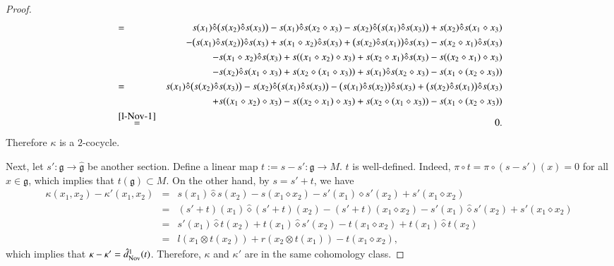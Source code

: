 \documentclass[12pt]{amsart}
\theoremstyle{definition}
\newcommand{\g}{\mathfrak g}
\newcommand{\ot}{\otimes}
\newcommand{\nov}{{\rm Nov}}
\begin{document}
\begin{proof}
\begin{eqnarray*}
		&=& s(x_1)\hat{\diamond}\bigl(s(x_2)\hat{\diamond}s(x_3)\bigr)
		- s(x_1)\hat{\diamond}s(x_2\diamond x_3) - s(x_2)\hat{\diamond}\bigl(s(x_1)\hat{\diamond}s(x_3)\bigr)+ s(x_2)\hat{\diamond}s(x_1\diamond x_3) \\
		&&- \bigl(s(x_1)\hat{\diamond}s(x_2)\bigr)\hat{\diamond}s(x_3)
		+ s(x_1\diamond x_2)\hat{\diamond}s(x_3)+ \bigl(s(x_2)\hat{\diamond}s(x_1)\bigr)\hat{\diamond}s(x_3)- s(x_2\diamond x_1)\hat{\diamond}s(x_3) \\
		&&- s(x_1\diamond x_2)\hat{\diamond}s(x_3)
		+ s((x_1\diamond x_2)\diamond x_3) + s(x_2\diamond x_1)\hat{\diamond}s(x_3)- s((x_2\diamond x_1)\diamond x_3) \\
		&&- s(x_2)\hat{\diamond}s(x_1\diamond x_3)
		+ s(x_2\diamond(x_1\diamond x_3)) + s(x_1)\hat{\diamond}s(x_2\diamond x_3)- s(x_1\diamond(x_2\diamond x_3))\\
		&=& s(x_1)\hat{\diamond}\bigl(s(x_2)\hat{\diamond}s(x_3)\bigr)
		- s(x_2)\hat{\diamond}\bigl(s(x_1)\hat{\diamond}s(x_3)\bigr) - \bigl(s(x_1)\hat{\diamond}s(x_2)\bigr)\hat{\diamond}s(x_3)
		+ \bigl(s(x_2)\hat{\diamond}s(x_1)\bigr)\hat{\diamond}s(x_3)\\
		&& + s((x_1\diamond x_2)\diamond x_3)
		- s((x_2\diamond x_1)\diamond x_3) + s(x_2\diamond(x_1\diamond x_3))
		- s(x_1\diamond(x_2\diamond x_3))\\
		&\overset{\eqref{l-Nov-1}}{=}&0.
	\end{eqnarray*}
	Therefore $\kappa$ is a $2$-cocycle.
	
	Next, let $s':\g\to\hat{\g}$ be another section. Define a linear map $t:=s-s':\g\to M$. $t$ is well-defined. Indeed, $\pi\circ t=\pi\circ(s-s')(x)=0$ for all $x\in\g$, which implies that $t(\g)\subset M$.
		On the other hand, by $s=s'+t$, we have
	\begin{eqnarray*}
		\kappa(x_1,x_2)-\kappa'(x_1,x_2)&=&s(x_1)\hat{\diamond} s(x_2)-s(x_1\diamond x_2)-s'(x_1)\hat{\diamond} s'(x_2)+s'(x_1\diamond x_2)\\
		&=&(s'+t)(x_1)\hat{\diamond} (s'+t)(x_2)-(s'+t)(x_1\diamond x_2)-s'(x_1)\hat{\diamond} s'(x_2)+s'(x_1\diamond x_2)\\
		&=&s'(x_1)\hat{\diamond}t(x_2)+t(x_1)\hat{\diamond} s'(x_2)-t(x_1\diamond x_2)+t(x_1)\hat{\diamond}t(x_2)\\
		&=&l(x_1\ot t(x_2))+r(x_2\ot t(x_1))-t(x_1\diamond x_2),
	\end{eqnarray*}
	which implies that $\kappa-\kappa'=\hat{d}_\nov^1(t)$. Therefore, $\kappa$ and $\kappa'$ are in the same cohomology class.
\end{proof}
\end{document}

